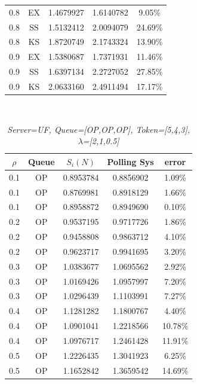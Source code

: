 \documentclass[12pt,a4paper,italian]{article}
\begin{document}
\begin{table}[ht!]
\begin{minipage}[b]{0.48\linewidth}
\begin{tabular}{c c c c c}
			 0.8 & EX & 1.4679927 &   1.6140782    & 9.05\%  \\
			 0.8 & SS & 1.5132412 &   2.0094079    & 24.69\% \\
			 0.8 & KS & 1.8720749 &   2.1743324    & 13.90\% \\ \hline \hline
			 0.9 & EX & 1.5380687 &   1.7371931    & 11.46\% \\
			 0.9 & SS & 1.6397134 &   2.2727052    & 27.85\% \\
			 0.9 & KS & 2.0633160 &   2.4911494    & 17.17\% \\\hline
			 
			 
		\end{tabular}
		
	\end{minipage}
\end{table}
\ \ \
\begin{table}[ht!]
	\begin{minipage}[b]{0.48\linewidth}\centering
		\centering
		\caption{\scriptsize \emph{Server=UF, Queue=[OP,OP,OP], Token=[5,4,3], $\lambda$=[2,1,0.5] }}
		\label{tab19}
		\tiny
		\begin{tabular}{c c c c c}
			\hline
			$\rho$ & Queue & $S_i(N)$ & Polling Sys & error \\ \hline
			0.1 & OP & 0.8953784 &   0.8856902    & 1.09\%  \\
			0.1 & OP & 0.8769981 &   0.8918129    & 1.66\%  \\
			0.1 & OP & 0.8958872 &   0.8949690    & 0.10\%  \\ \hline \hline
			0.2 & OP & 0.9537195 &   0.9717726    & 1.86\%  \\
			0.2 & OP & 0.9458808 &   0.9863712    & 4.10\%  \\
			0.2 & OP & 0.9623717 &   0.9941695    & 3.20\%  \\ \hline \hline
			0.3 & OP & 1.0383677 &   1.0695562    & 2.92\%  \\
			0.3 & OP & 1.0169426 &   1.0957997    & 7.20\%  \\
			0.3 & OP & 1.0296439 &   1.1103991    & 7.27\%  \\ \hline \hline
			0.4 & OP & 1.1281282 &   1.1800767    & 4.40\%  \\
			0.4 & OP & 1.0901041 &   1.2218566    & 10.78\% \\
			0.4 & OP & 1.0976717 &   1.2461428    & 11.91\% \\ \hline \hline
			0.5 & OP & 1.2226435 &   1.3041923    & 6.25\%  \\
			0.5 & OP & 1.1652842 &   1.3659542    & 14.69\% \\

\end{tabular}
\end{minipage}
\end{table}
\end{document}
